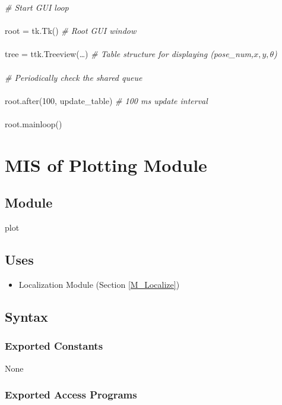 \documentclass[12pt, titlepage]{article}
\begin{document}
\noindent \textit{\# Start GUI loop}\\\\
root = tk.Tk()  \textit{\# Root GUI window}\\\\
tree = ttk.Treeview(\dots)  \textit{\# Table structure for displaying (pose\_num,$ x, y, \theta$)}\\\\

\noindent \textit{\# Periodically check the shared queue}\\\\
root.after(100, update\_table)  \textit{\# 100 ms update interval}\\\\
root.mainloop()



\newpage

\section{MIS of Plotting Module} \label{M_Plotting}

\subsection{Module}

plot 

\subsection{Uses}
\begin{itemize}
  \item Localization Module (Section \ref{M_Localize})
\end{itemize}

\subsection{Syntax}

\subsubsection{Exported Constants}
None

\subsubsection{Exported Access Programs}
\end{document}
